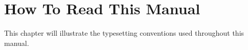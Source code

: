 
\chapter{How To Read This Manual}
\label{chp-howtoread}

This chapter will illustrate the typesetting conventions used
throughout this manual.

